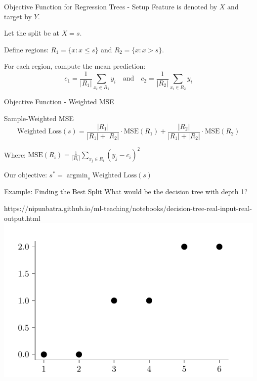 \documentclass[usenames,dvipsnames]{beamer}
\begin{document}
\begin{frame}{Objective Function for Regression Trees - Setup}
Feature is denoted by $X$ and target by $Y$.

Let the split be at $X = s$.

Define regions: $R_1 = \{x : x \leq s\}$ and $R_2 = \{x : x > s\}$.

For each region, compute the mean prediction:
$$c_1 = \frac{1}{|R_1|} \sum_{x_i \in R_1} y_i \quad\text{and}\quad c_2 = \frac{1}{|R_2|} \sum_{x_i \in R_2} y_i$$
\end{frame}

\begin{frame}{Objective Function - Weighted MSE }

\scriptsize
\begin{examplebox}{Sample-Weighted MSE}
$$\text{Weighted Loss}(s) = \frac{|R_1|}{|R_1| + |R_2|} \cdot \text{MSE}(R_1) + \frac{|R_2|}{|R_1| + |R_2|} \cdot \text{MSE}(R_2)$$

Where: $\text{MSE}(R_i) = \frac{1}{|R_i|} \sum_{x_j \in R_i} (y_j - c_i)^2$
\end{examplebox}

Our objective: $s^* = \operatorname*{\arg\min}_{s} \text{Weighted Loss}(s)$
\end{frame}



    \begin{frame}{Example: Finding the Best Split}
    What would be the decision tree with depth 1?
    \begin{center}
    	\begin{notebookbox}{https://nipunbatra.github.io/ml-teaching/notebooks/decision-tree-real-input-real-output.html}
    		\includegraphics{../assets/decision-trees/figures/ri-ro-dataset.pdf}
    	  \end{notebookbox}
    \end{center}
    \end{frame}
\end{document}
